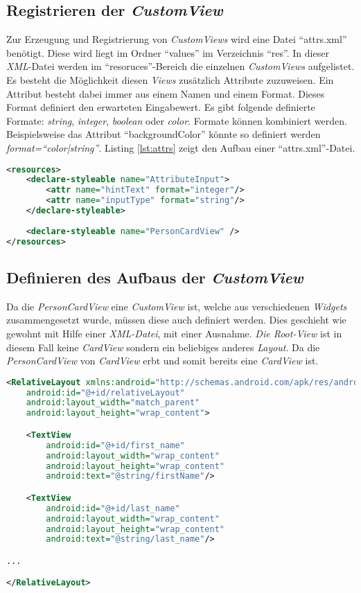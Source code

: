 \subsection{Registrieren der \textit{CustomView}}
Zur Erzeugung und Registrierung von \textit{CustomViews} wird eine Datei \enquote{attrs.xml} benötigt. Diese wird liegt im Ordner \enquote{values} im Verzeichnis \enquote{res}. 
In dieser \textit{XML}-Datei werden im \enquote{resoruces}-Bereich die einzelnen \textit{CustomViews} aufgelistet. Es besteht die Möglichkeit diesen \textit{Views} zusätzlich Attribute zuzuweisen. Ein Attribut besteht dabei immer aus einem Namen und einem Format. Dieses Format definiert den erwarteten Eingabewert. Es gibt folgende definierte Formate: \textit{string}, \textit{integer}, \textit{boolean} oder \textit{color}. 
Formate können kombiniert werden. Beispielsweise das Attribut \enquote{backgroundColor} könnte so definiert werden \textit{format=\enquote{color|string}}. Listing \ref{lst:attrs} zeigt den Aufbau einer \enquote{attrs.xml}-Datei.

\newpage
\begin{lstlisting}[label=lst:attrs,
language=xml,
firstnumber=1,
caption=Aufbau einer \textit{attrs.xml} - Datei]				  
<resources>
	<declare-styleable name="AttributeInput">
		<attr name="hintText" format="integer"/>
		<attr name="inputType" format="string"/>
	</declare-styleable>
	
	<declare-styleable name="PersonCardView" />
</resources>
\end{lstlisting}

\subsection{Definieren des Aufbaus der \textit{CustomView}}

Da die \textit{PersonCardView} eine \textit{CustomView} ist, welche aus verschiedenen \textit{Widgets} zusammengesetzt wurde, müssen diese auch definiert werden. Dies geschieht wie gewohnt mit Hilfe einer \textit{XML-Datei}, mit einer Ausnahme. \textit{Die Root-View} ist in diesem Fall keine \textit{CardView} sondern ein beliebiges anderes \textit{Layout}. Da die \textit{PersonCardView} von \textit{CardView} erbt und somit bereits eine \textit{CardView} ist.

\begin{lstlisting}[label=lst:personCardViewXml,
language=xml,
firstnumber=1,
caption=Aufbau der \textit{PersonCardView} mit Hilfe einer \textit{XML}-Datei]				  
<RelativeLayout xmlns:android="http://schemas.android.com/apk/res/android"
	android:id="@+id/relativeLayout"
	android:layout_width="match_parent"
	android:layout_height="wrap_content">

	<TextView
		android:id="@+id/first_name"
		android:layout_width="wrap_content"
		android:layout_height="wrap_content"
		android:text="@string/firstName"/>

	<TextView
		android:id="@+id/last_name"
		android:layout_width="wrap_content"
		android:layout_height="wrap_content"
		android:text="@string/last_name"/>

...

</RelativeLayout>
\end{lstlisting}

